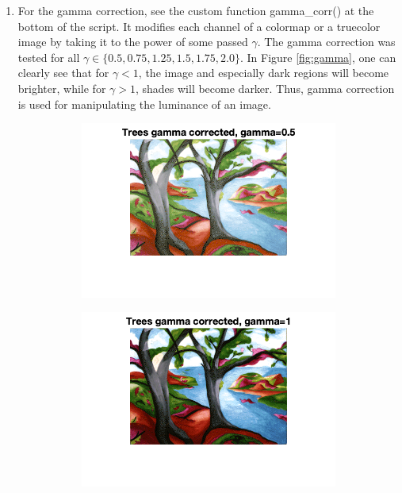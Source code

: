 \documentclass{article}
\begin{document}
\begin{enumerate}
    \item For the gamma correction, see the custom function gamma\_corr() at the bottom of the script. It modifies each channel of a colormap or a truecolor image by taking it to the power of some passed $\gamma$. The gamma correction was tested for all $\gamma \in \{0.5, 0.75, 1.25, 1.5, 1.75, 2.0\}$. In Figure \ref{fig:gamma}, one can clearly see that for $\gamma < 1$, the image and especially dark regions will become brighter, while for $\gamma > 1$, shades will become darker. Thus, gamma correction is used for manipulating the luminance of an image.
    \begin{figure}
        \centering
        \begin{subfigure}[c]{0.32\textwidth}
            \includegraphics[width=\textwidth]{images/trees_gamma_05.png}
        \end{subfigure}
        \begin{subfigure}[c]{0.32\textwidth}
            \includegraphics[width=\textwidth]{images/trees_gamma_1.png}

\end{subfigure}
\end{figure}
\end{enumerate}
\end{document}
